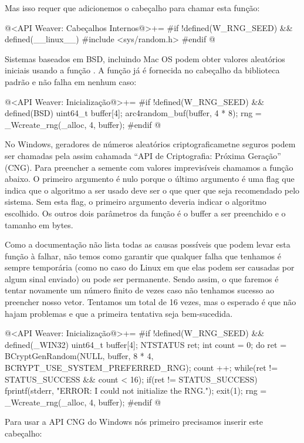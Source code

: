 Mas isso requer que adicionemos o cabeçalho para chamar esta função:

\iniciocodigo
@<API Weaver: Cabeçalhos Internos@>+=
#if !defined(W_RNG_SEED) && defined(__linux__)
#include <sys/random.h>
#endif
@
\fimcodigo

Sistemas baseados em BSD, incluindo Mac OS podem obter valores
aleatórios iniciais usando a função . A
função já é fornecida no cabeçalho da biblioteca padrão e não falha em
nenhum caso:

\iniciocodigo
@<API Weaver: Inicialização@>+=
#if !defined(W_RNG_SEED) && defined(BSD)
{
  uint64_t buffer[4];
  arc4random_buf(buffer, 4 * 8);
  rng = _Wcreate_rng(_alloc, 4, buffer);
}
#endif
@
\fimcodigo

No Windows, geradores de números aleatórios criptograficametne seguros
podem ser chamadas pela assim cahamada ``API de Criptografia: Próxima
Geração'' (CNG). Para preencher a semente com valores imprevisíveis
chamamos a função abaixo. O primeiro argumento é nulo porque o último
argumento é uma flag que indica que o algoritmo a ser usado deve ser o
que quer que seja recomendado pelo sistema. Sem esta flag, o primeiro
argumento deveria indicar o algoritmo escolhido. Os outros dois
parâmetros da função é o buffer a ser preenchido e o tamanho em bytes.

Como a documentação não lista todas as causas possíveis que podem
levar esta função à falhar, não temos como garantir que qualquer falha
que tenhamos é sempre temporária (como no caso do Linux em que elas
podem ser causadas por algum sinal enviado) ou pode ser
permanente. Sendo assim, o que faremos é tentar novamente um número
finito de vezes caso não tenhamos sucesso ao preencher nosso
vetor. Tentamos um total de 16 vezes, mas o esperado é que não hajam
problemas e que a primeira tentativa seja bem-sucedida.

\iniciocodigo
@<API Weaver: Inicialização@>+=
#if !defined(W_RNG_SEED) && defined(_WIN32)
{
  uint64_t buffer[4];
  NTSTATUS ret;
  int count = 0;
  do{
    ret = BCryptGenRandom(NULL, buffer, 8 * 4,
                          BCRYPT_USE_SYSTEM_PREFERRED_RNG);
    count ++;
  } while(ret != STATUS_SUCCESS && count < 16);
  if(ret != STATUS_SUCCESS){
    fprintf(stderr, "ERROR: I could not initialize the RNG.\n");
    exit(1);
  }
  rng = _Wcreate_rng(_alloc, 4, buffer);
}
#endif
@
\fimcodigo

Para usar a API CNG do Windows nós primeiro precisamos inserir este
cabeçalho:

